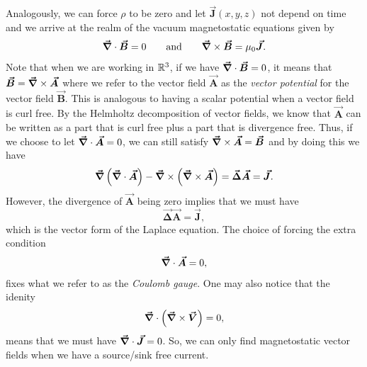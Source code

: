 \documentclass[12pt]{article} %
\newcommand{\vecfieldB}{\boldsymbol{\vec{B}}}
\newcommand{\vecfieldJ}{\boldsymbol{\vec{J}}}
\newcommand{\vecfieldA}{\boldsymbol{\vec{A}}}
\newcommand{\veclaplace}{\boldsymbol{\vec{\Delta}}}
\begin{document}
\begin{solution}
\begin{enumerate}[(a)]
    Analogously, we can force $\rho$ to be zero and let $\vecfieldJ(x,y,z)$ not depend on time and we arrive at the realm of the vacuum magnetostatic equations given by
    \[
        \grad \cdot \vecfieldB = 0 \qquad \textrm{and} \qquad \grad \times \vecfieldB = \mu_0 \vecfieldJ.
    \]
    Note that when we are working in $\mathbb{R}^3$, if we have $\grad \cdot \vecfieldB=0$, it means that $\vecfieldB = \grad \times \vecfieldA$ where we refer to the vector field $\vecfieldA$ as the \emph{vector potential} for the vector field $\vecfieldB$.  This is analogous to having a scalar potential when a vector field is curl free. By the Helmholtz decomposition of vector fields, we know that $\vecfieldA$ can be written as a part that is curl free plus a part that is divergence free. Thus, if we choose to let $\grad \cdot \vecfieldA=0$, we can still satisfy $\grad \times \vecfieldA = \vecfieldB$ and by doing this we have
    \[
    \grad \left(\grad \cdot \vecfieldA\right) - \grad \times \left(\grad \times \vecfieldA\right)= \veclaplace \vecfieldA = \vecfieldJ.
    \]
    However, the divergence of $\vecfieldA$ being zero implies that we must have
    \[
    \veclaplace \vecfieldA = \vecfieldJ,
    \]
    which is the vector form of the Laplace equation.  The choice of forcing the extra condition
    \[
    \grad \cdot \vecfieldA=0,
    \]
    fixes what we refer to as the \emph{Coulomb gauge}.  One may also notice that the idenity
    \[
    \boldsymbol{\vec{\nabla}} \cdot \left( \boldsymbol{\vec{\nabla}} \times \boldsymbol{\vec{V}} \right) = 0,
    \]
    means that we must have $\grad \cdot \vecfieldJ=0$.  So, we can only find magnetostatic vector fields when we have a source/sink free current.
    

\end{enumerate}
\end{solution}
\end{document}
